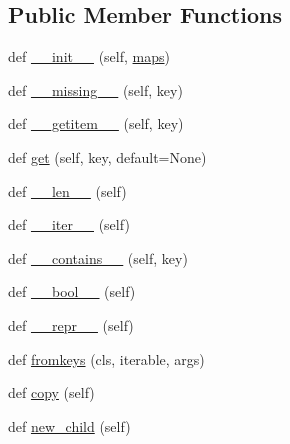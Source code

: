 \subsection*{Public Member Functions}
\begin{DoxyCompactItemize}
\item 
def \hyperlink{classpip_1_1__vendor_1_1distlib_1_1compat_1_1ChainMap_a9b6137150ce55b7ce69b969f60d97b83}{\+\_\+\+\_\+init\+\_\+\+\_\+} (self, \hyperlink{classpip_1_1__vendor_1_1distlib_1_1compat_1_1ChainMap_a00c70d531abd661a7593f8b48e09a2e9}{maps})
\item 
def \hyperlink{classpip_1_1__vendor_1_1distlib_1_1compat_1_1ChainMap_af953a3e668b98605370b342301e13d53}{\+\_\+\+\_\+missing\+\_\+\+\_\+} (self, key)
\item 
def \hyperlink{classpip_1_1__vendor_1_1distlib_1_1compat_1_1ChainMap_a98a767670c5c6b1f17209c590dd224d6}{\+\_\+\+\_\+getitem\+\_\+\+\_\+} (self, key)
\item 
def \hyperlink{classpip_1_1__vendor_1_1distlib_1_1compat_1_1ChainMap_a657b681156ad31c3b7391fcfdfd0bc5f}{get} (self, key, default=None)
\item 
def \hyperlink{classpip_1_1__vendor_1_1distlib_1_1compat_1_1ChainMap_ac5d594d057a9833524b5fac6f00e419e}{\+\_\+\+\_\+len\+\_\+\+\_\+} (self)
\item 
def \hyperlink{classpip_1_1__vendor_1_1distlib_1_1compat_1_1ChainMap_a978cd396490b280e12fa4441e6742514}{\+\_\+\+\_\+iter\+\_\+\+\_\+} (self)
\item 
def \hyperlink{classpip_1_1__vendor_1_1distlib_1_1compat_1_1ChainMap_ad37104e3f3cc6a145da42418dfb9cd0f}{\+\_\+\+\_\+contains\+\_\+\+\_\+} (self, key)
\item 
def \hyperlink{classpip_1_1__vendor_1_1distlib_1_1compat_1_1ChainMap_a37d4e11382071b86a764e8152cf12ed5}{\+\_\+\+\_\+bool\+\_\+\+\_\+} (self)
\item 
def \hyperlink{classpip_1_1__vendor_1_1distlib_1_1compat_1_1ChainMap_ac2af7ba9f80594676f275a61049711a4}{\+\_\+\+\_\+repr\+\_\+\+\_\+} (self)
\item 
def \hyperlink{classpip_1_1__vendor_1_1distlib_1_1compat_1_1ChainMap_a257fe5c57a28f7399999581b1c30ccb2}{fromkeys} (cls, iterable, args)
\item 
def \hyperlink{classpip_1_1__vendor_1_1distlib_1_1compat_1_1ChainMap_a79bb031e9815e2b0758e592e77fee435}{copy} (self)
\item 
def \hyperlink{classpip_1_1__vendor_1_1distlib_1_1compat_1_1ChainMap_a1a348cd6289a1aeacfc7caa7e8cf8e73}{new\+\_\+child} (self)

\end{DoxyCompactItemize}
